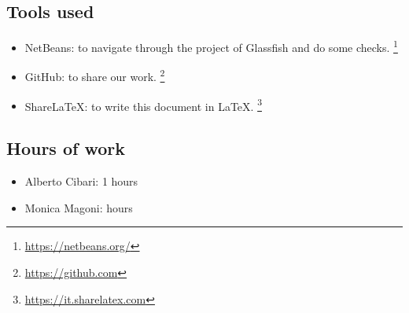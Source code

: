 \subsection*{Tools used}
    \begin{itemize}
        \item NetBeans: to navigate through the project of Glassfish and do some checks. 
            \footnote{\url{https://netbeans.org/}} 
        \item GitHub: to share our work. 
            \footnote{\url{https://github.com}} 
        \item ShareLaTeX: to write this document in LaTeX. 
            \footnote{\url{https://it.sharelatex.com}}
    \end{itemize}

\subsection*{Hours of work}
    \begin{itemize}
    \item Alberto Cibari: 1 hours
    \item Monica Magoni:  hours
    \end{itemize}

